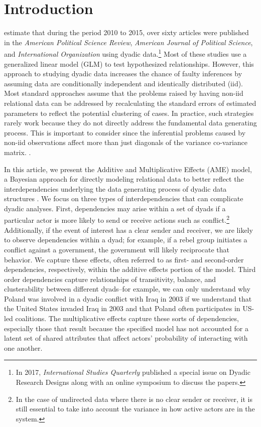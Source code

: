 \section{\textbf{Introduction}}

\citet{aronow:etal:2015} estimate that during the period 2010 to 2015, over sixty articles were published in the \textit{American Political Science Review}, \textit{American Journal of Political Science}, and \textit{International Organization} using dyadic data.\footnote{In 2017, \textit{International Studies Quarterly} published a special issue on Dyadic Research Designs along with an online symposium to discuss the papers.} Most of these studies use a generalized linear model (GLM) to test hypothesized relationships.  However, this approach to studying dyadic data increases the chance of faulty inferences by assuming data are conditionally independent and identically distributed (iid). Most standard approaches assume that the problems raised by having non-iid relational data can be addressed by recalculating the standard errors of estimated parameters to reflect the potential clustering of cases. In practice, such strategies rarely work because they do not directly address the fundamental data generating process. This is important to consider since the inferential problems caused by non-iid  observations affect more than just diagonals of the variance co-variance matrix. \citep{beck:2012,franzese:hayes:2007,king:roberts:2014}.

In this article, we present the Additive and Multiplicative Effects (AME) model, a Bayesian approach for directly modeling relational data to better reflect the interdependencies underlying the data generating process of dyadic data structures \citep{hoff:2008,minhas:etal:2016:arxiv}. We focus on three types of interdependencies that can complicate dyadic analyses. First, dependencies may arise within a set of dyads if a particular actor is more likely to send or receive actions such as conflict.\footnote{In the case of undirected data where there is no clear sender or receiver, it is still essential to take into account the variance in how active actors are in the system.} Additionally, if the event of interest has a clear sender and receiver, we are likely to observe dependencies within a dyad; for example, if a rebel group initiates a conflict against a government, the government will likely reciprocate that behavior. We capture these effects, often referred to as first- and second-order dependencies, respectively, within the additive effects portion of the model. Third order dependencies capture relationships of transitivity, balance, and clusterability between different dyads--for example, we can only understand why Poland was involved in a dyadic conflict with Iraq in 2003 if we understand that the United States invaded Iraq in 2003 and that Poland often participates in US-led coalitions. The multiplicative effects capture these sorts of dependencies, especially those that result because the specified model has not accounted for a latent set of shared attributes that affect actors' probability of interacting with one another.  


